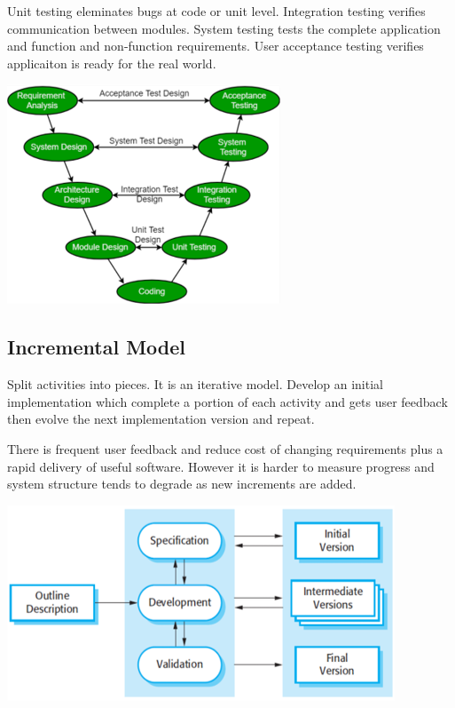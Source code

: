 \documentclass{article}
\begin{document}
    Unit testing eleminates bugs at code or unit level. Integration testing verifies 
    communication between modules. System testing tests the complete application 
    and function and non-function requirements. User acceptance testing 
    verifies applicaiton is ready for the real world.

    \begin{center}
        \includegraphics[scale=0.7]{V-Model.png}
    \end{center}

    \subsection*{Incremental Model}

    Split activities into pieces. It is an iterative model. Develop an initial implementation
    which complete a portion of each activity and gets user feedback then evolve the next 
    implementation version and repeat.

    There is frequent user feedback and reduce cost of changing requirements plus a 
    rapid delivery of useful software.
    However it is harder to measure progress and system structure tends to degrade 
    as new increments are added.

    \begin{center}
        \includegraphics[scale=0.7]{IncrementalModel.png}
    \end{center}
\end{document}
